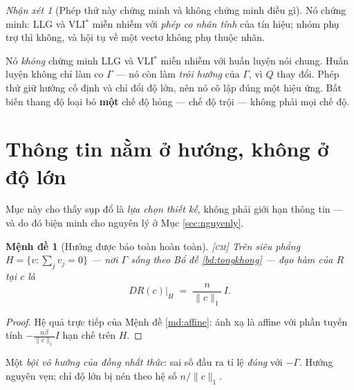 \documentclass[11pt,a4paper]{article}
\newtheorem{menhde}[dinhly]{Mệnh đề}
\theoremstyle{remark}
\newtheorem{nhanxet}[dinhly]{Nhận xét}
\begin{document}
\begin{nhanxet}[Phép thử này chứng minh và không chứng minh điều gì]
\label{nx:gioihankiem}
Nó chứng minh: LLG và VLI$^*$ miễn nhiễm với \emph{phép co nhân tính} của tín
hiệu; nhóm phụ trợ thì không, và hội tụ về một vectơ không phụ thuộc nhãn.

Nó \emph{không} chứng minh LLG và VLI$^*$ miễn nhiễm với huấn luyện nói
chung. Huấn luyện không chỉ làm co $\Gamma$ --- nó còn làm \emph{trôi hướng}
của $\Gamma$, vì $Q$ thay đổi. Phép thử giữ hướng cố định và chỉ đổi độ lớn,
nên nó cô lập đúng một hiệu ứng. Bất biến thang độ loại bỏ \textbf{một} chế
độ hỏng --- chế độ trội --- không phải mọi chế độ.
\end{nhanxet}

\section{Thông tin nằm ở hướng, không ở độ lớn}
\label{sec:thongtin}

Mục này cho thấy sụp đổ là \emph{lựa chọn thiết kế}, không phải giới hạn
thông tin --- và do đó biện minh cho nguyên lý ở Mục \ref{sec:nguyenly}.

\begin{menhde}[Hướng được bảo toàn hoàn toàn]
\label{md:huong}
\textsc{[cm]}\; Trên siêu phẳng $H=\{v:\sum_j v_j=0\}$ --- nơi $\Gamma$ sống
theo Bổ đề \ref{bd:tongkhong} --- đạo hàm của $R$ tại $c$ là
\begin{equation}
DR(c)\big|_H \;=\; \frac{n}{\|c\|_1}\,I .
\label{eq:DR}
\end{equation}
\end{menhde}

\begin{proof}
Hệ quả trực tiếp của Mệnh đề \ref{md:affine}: ánh xạ là affine với phần tuyến
tính $-\tfrac{n\beta}{\|c\|_1}I$ hạn chế trên $H$.
\end{proof}

Một \emph{bội vô hướng của đồng nhất thức}: sai số đầu ra tỉ lệ \emph{đúng}
với $-\Gamma$. Hướng nguyên vẹn; chỉ độ lớn bị nén theo hệ số $n/\|c\|_1$.
\end{document}
